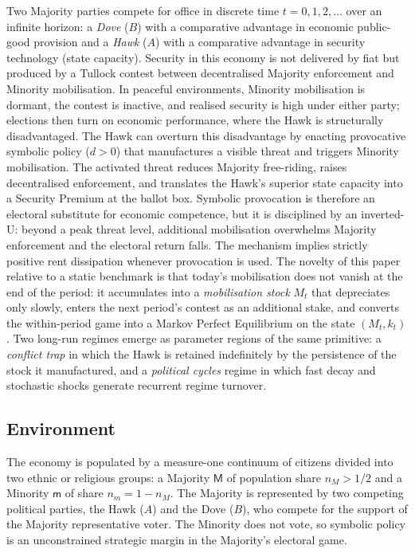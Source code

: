 \documentclass[11pt,twoside]{extarticle}
\begin{document}
Two Majority parties compete for office in discrete time $t=0,1,2,\dots$ over an infinite horizon: a \emph{Dove} ($B$) with a comparative advantage in economic public-good provision and a \emph{Hawk} ($A$) with a comparative advantage in security technology (state capacity). Security in this economy is not delivered by fiat but produced by a Tullock contest between decentralised Majority enforcement and Minority mobilisation. In peaceful environments, Minority mobilisation is dormant, the contest is inactive, and realised security is high under either party; elections then turn on economic performance, where the Hawk is structurally disadvantaged. The Hawk can overturn this disadvantage by enacting provocative symbolic policy ($d>0$) that manufactures a visible threat and triggers Minority mobilisation. The activated threat reduces Majority free-riding, raises decentralised enforcement, and translates the Hawk's superior state capacity into a Security Premium at the ballot box. Symbolic provocation is therefore an electoral substitute for economic competence, but it is disciplined by an inverted-U: beyond a peak threat level, additional mobilisation overwhelms Majority enforcement and the electoral return falls. The mechanism implies strictly positive rent dissipation whenever provocation is used. The novelty of this paper relative to a static benchmark is that today's mobilisation does not vanish at the end of the period: it accumulates into a \emph{mobilisation stock} $M_t$ that depreciates only slowly, enters the next period's contest as an additional stake, and converts the within-period game into a Markov Perfect Equilibrium on the state $(M_t,k_t)$. Two long-run regimes emerge as parameter regions of the same primitive: a \emph{conflict trap} in which the Hawk is retained indefinitely by the persistence of the stock it manufactured, and a \emph{political cycles} regime in which fast decay and stochastic shocks generate recurrent regime turnover.

\subsection{Environment}

The economy is populated by a measure-one continuum of citizens divided into two ethnic or religious groups: a Majority $\mathsf{M}$ of population share $n_M>1/2$ and a Minority $\mathsf{m}$ of share $n_m=1-n_M$. The Majority is represented by two competing political parties, the Hawk ($A$) and the Dove ($B$), who compete for the support of the Majority representative voter. The Minority does not vote, so symbolic policy is an unconstrained strategic margin in the Majority's electoral game.
\end{document}
